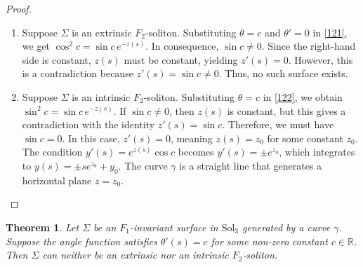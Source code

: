 \documentclass[a4paper,12pt]{amsart}
\theoremstyle{plain}
\newtheorem{theorem}{Theorem}[section]
\theoremstyle{definition}
\def\r{\mathbb R}
\def\sol{\text{Sol}_3}
\begin{document}
\begin{proof}
 \begin{enumerate}
\item Suppose $\Sigma$ is an extrinsic $F_2$-soliton. 
Substituting $\theta = c$ and $\theta' = 0$ in \eqref{121}, we get $\cos^2 c = \sin c\, e^{-z(s)}$. In consequence, $\sin c \neq 0$. Since the right-hand side is constant, $z(s)$ must be constant, yielding $z'(s) = 0$. However, this is a contradiction because $z'(s) = \sin c \neq 0$. Thus, no such surface exists.

\item Suppose $\Sigma$ is an intrinsic $F_2$-soliton. Substituting $\theta = c$ in \eqref{122}, we obtain $\sin^2 c = \sin c\, e^{-z(s)}$. 
If $\sin c \neq 0$, then $z(s)$ is constant, but this gives a contradiction with the identity $z'(s) = \sin c$.
Therefore, we must have $\sin c = 0$. In this case, $z'(s) = 0$, meaning $z(s) = z_0$ for some constant $z_0$. The condition $y'(s) = e^{z(s)}\cos c$ becomes $y'(s) = \pm e^{z_0}$, which integrates to $y(s) = \pm s e^{z_0} + y_0$. The curve $\gamma$ is a straight line that generates a horizontal plane $z = z_0$. 
\end{enumerate}
\end{proof}




\begin{theorem}
Let $\Sigma$ be an $F_1$-invariant surface in $\sol$ generated by a curve $\gamma$. Suppose the angle function satisfies $\theta'(s) = c$ for some non-zero constant $c \in \r$. Then $\Sigma$ can neither be an extrinsic nor an intrinsic $F_2$-soliton.
\end{theorem}
\end{document}
